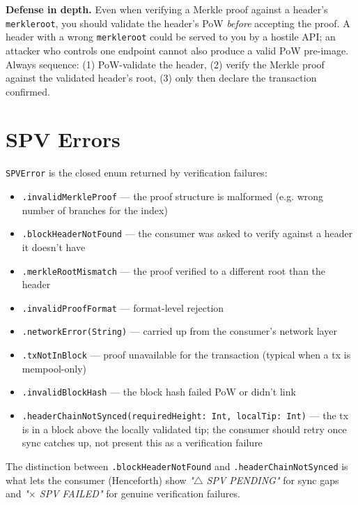 \documentclass[a4paper, 11pt, openany]{book}
\begin{document}
\begin{notebox}
\textbf{Defense in depth.} Even when verifying a Merkle proof against a header's \texttt{merkleroot}, you should validate the header's PoW \emph{before} accepting the proof. A header with a wrong \texttt{merkleroot} could be served to you by a hostile API; an attacker who controls one endpoint cannot also produce a valid PoW pre-image. Always sequence: (1) PoW-validate the header, (2) verify the Merkle proof against the validated header's root, (3) only then declare the transaction confirmed.
\end{notebox}

\section{SPV Errors}

\texttt{SPVError} is the closed enum returned by verification failures:

\begin{itemize}
\item \texttt{.invalidMerkleProof} --- the proof structure is malformed (e.g. wrong number of branches for the index)
\item \texttt{.blockHeaderNotFound} --- the consumer was asked to verify against a header it doesn't have
\item \texttt{.merkleRootMismatch} --- the proof verified to a different root than the header
\item \texttt{.invalidProofFormat} --- format-level rejection
\item \texttt{.networkError(String)} --- carried up from the consumer's network layer
\item \texttt{.txNotInBlock} --- proof unavailable for the transaction (typical when a tx is mempool-only)
\item \texttt{.invalidBlockHash} --- the block hash failed PoW or didn't link
\item \texttt{.headerChainNotSynced(requiredHeight: Int, localTip: Int)} --- the tx is in a block above the locally validated tip; the consumer should retry once sync catches up, not present this as a verification failure
\end{itemize}

The distinction between \texttt{.blockHeaderNotFound} and \texttt{.headerChainNotSynced} is what lets the consumer (Henceforth) show \emph{"$\bigtriangleup$ SPV PENDING"} for sync gaps and \emph{"$\times$ SPV FAILED"} for genuine verification failures.
\end{document}
